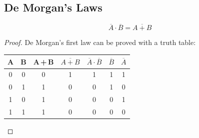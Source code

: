         \subsection{De Morgan's Laws}
            \begin{theorem}
                \begin{equation}
                    \overline{A}\cdot\overline{B}=\overline{A+B}
                \end{equation}
            \end{theorem}
            \begin{proof}
                De Morgan's first law can be proved with a truth table:

                \begin{center}
                    \begin{tabular}{c c|c c|c c c}
                        \textbf{A} & \textbf{B} & \textbf{A\,+\,B} & \textbf{$\overline{A+B}$} & \textbf{$\overline{A}\cdot\overline{B}$} & \textbf{$\overline{B}$} & \textbf{$\overline{A}$} \\
                        \hline
                        0 & 0 & 0 & 1 & 1 & 1 & 1 \\
                        0 & 1 & 1 & 0 & 0 & 1 & 0 \\
                        1 & 0 & 1 & 0 & 0 & 0 & 1 \\
                        1 & 1 & 1 & 0 & 0 & 0 & 0
                    \end{tabular}
                \end{center}
            \end{proof}
            
